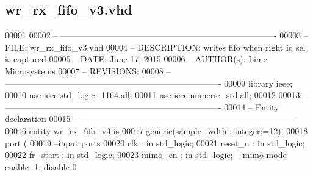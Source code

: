 \subsection{wr\+\_\+rx\+\_\+fifo\+\_\+v3.\+vhd}
\label{wr__rx__fifo__v3_8vhd_source}

\begin{DoxyCode}
00001 
00002 \textcolor{keyword}{-- ---------------------------------------------------------------------------- }
00003 \textcolor{keyword}{-- FILE:    wr\_rx\_fifo\_v3.vhd}
00004 \textcolor{keyword}{-- DESCRIPTION: writes fifo when right iq sel is captured}
00005 \textcolor{keyword}{-- DATE:    June 17, 2015}
00006 \textcolor{keyword}{-- AUTHOR(s):   Lime Microsystems}
00007 \textcolor{keyword}{-- REVISIONS:}
00008 \textcolor{keyword}{-- ---------------------------------------------------------------------------- }
00009 \textcolor{vhdlkeyword}{library }\textcolor{keywordflow}{ieee};
00010 \textcolor{vhdlkeyword}{use }ieee.std\_logic\_1164.\textcolor{keywordflow}{all};
00011 \textcolor{vhdlkeyword}{use }ieee.numeric\_std.\textcolor{keywordflow}{all};
00012 
00013 \textcolor{keyword}{-- ----------------------------------------------------------------------------}
00014 \textcolor{keyword}{-- Entity declaration}
00015 \textcolor{keyword}{-- ----------------------------------------------------------------------------}
00016 \textcolor{keywordflow}{entity }wr_rx_fifo_v3 \textcolor{keywordflow}{is}
00017   \textcolor{keywordflow}{generic}\textcolor{vhdlchar}{(}\textcolor{vhdlchar}{sample_wdth} \textcolor{vhdlchar}{:} \textcolor{comment}{integer}\textcolor{vhdlchar}{:=}\textcolor{vhdllogic}{}\textcolor{vhdllogic}{12}\textcolor{vhdlchar}{)};
00018   \textcolor{keywordflow}{port} \textcolor{vhdlchar}{(}
00019 \textcolor{keyword}{        --input ports }
00020             \textcolor{vhdlchar}{clk}         \textcolor{vhdlchar}{:} \textcolor{keywordflow}{in} \textcolor{comment}{std\_logic};
00021             \textcolor{vhdlchar}{reset_n}     \textcolor{vhdlchar}{:} \textcolor{keywordflow}{in} \textcolor{comment}{std\_logic};
00022             \textcolor{vhdlchar}{fr_start}        \textcolor{vhdlchar}{:} \textcolor{keywordflow}{in} \textcolor{comment}{std\_logic};
00023             \textcolor{vhdlchar}{mimo_en}     \textcolor{vhdlchar}{:} \textcolor{keywordflow}{in} \textcolor{comment}{std\_logic};\textcolor{keyword}{ -- mimo mode enable -1, disable-0}

\end{DoxyCode}

